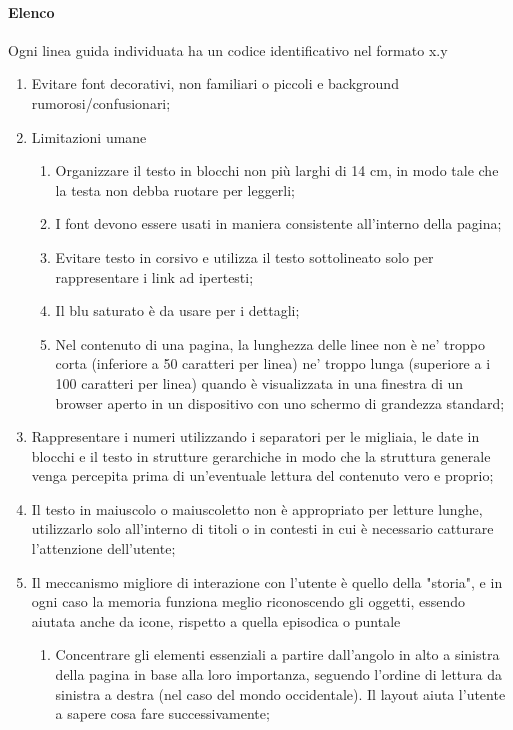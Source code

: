 \paragraph{Elenco}
Ogni linea guida individuata ha un codice identificativo nel formato x.y
\begin{enumerate}
    \item Evitare font decorativi, non familiari o piccoli e background rumorosi/confusionari;
    \item Limitazioni umane
    \begin{enumerate}
        \item Organizzare il testo in blocchi non più larghi di 14 cm, in modo tale che la testa non debba ruotare per leggerli;
        \item I font devono essere usati in maniera consistente all'interno della pagina;
        \item Evitare testo in corsivo e utilizza il testo sottolineato solo per rappresentare i link ad ipertesti;
        \item Il blu saturato è da usare per i dettagli;
        \item Nel contenuto di una pagina, la lunghezza delle linee non è ne' troppo corta (inferiore a 50 caratteri per linea) ne' troppo lunga (superiore a i 100 caratteri per linea) quando è visualizzata in una finestra di un browser aperto in un dispositivo con uno schermo di grandezza standard;
    \end{enumerate}
    \item Rappresentare i numeri utilizzando i separatori per le migliaia, le date in blocchi e il testo in strutture gerarchiche in modo che la struttura generale venga percepita prima di un'eventuale lettura del contenuto vero e proprio;
    \item Il testo in maiuscolo o maiuscoletto non è appropriato per letture lunghe, utilizzarlo solo all'interno di titoli o in contesti in cui è necessario catturare l'attenzione dell'utente;
    \item Il meccanismo migliore di interazione con l'utente è quello della "storia", e in ogni caso la memoria funziona meglio riconoscendo gli oggetti, essendo aiutata anche da icone, rispetto a quella episodica o puntale
    \begin{enumerate}
        \item Concentrare gli elementi essenziali a partire dall'angolo in alto a sinistra della pagina in base alla loro importanza, seguendo l'ordine di lettura da sinistra a destra (nel caso del mondo occidentale). Il layout aiuta l'utente a sapere cosa fare successivamente;

\end{enumerate}
\end{enumerate}
